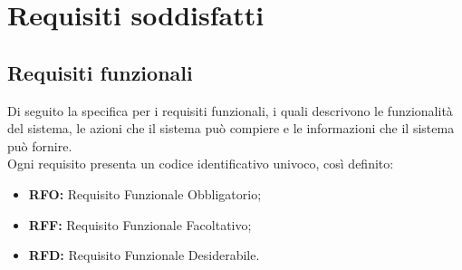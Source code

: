 \pagebreak
\section{Requisiti soddisfatti}
\subsection{Requisiti funzionali}

Di seguito la specifica per i requisiti funzionali, i quali descrivono le funzionalità del sistema, le azioni che il sistema può compiere e le informazioni che il sistema può fornire.\\
Ogni requisito presenta un codice identificativo univoco, così definito:
\begin{itemize}
    \item \textbf{RFO:} Requisito Funzionale Obbligatorio;
    \item \textbf{RFF:} Requisito Funzionale Facoltativo;
    \item \textbf{RFD:} Requisito Funzionale Desiderabile.
\end{itemize}


